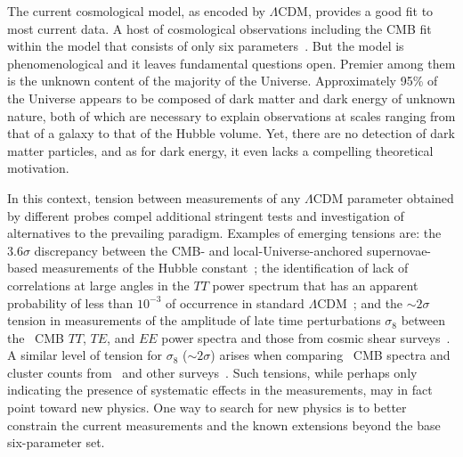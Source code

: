 \documentclass[PICOReport.tex]{subfiles}
\begin{document}

The current cosmological model, as encoded by $\Lambda$CDM, provides a good fit to most current data. A host of cosmological observations including the CMB fit within the model that consists of only six parameters~\citep{Planck2018_I}. But the model is phenomenological and it leaves fundamental questions open. Premier among them is the unknown content of the majority of the Universe. Approximately 95\% of the Universe appears to be composed of dark matter and dark energy of unknown nature, both of which are necessary to explain observations at scales ranging from that of a galaxy to that of the Hubble volume. Yet, there are no detection of dark matter particles, and as for dark energy, it even lacks a compelling theoretical motivation.

In this context, tension between measurements of any $\Lambda$CDM parameter obtained by different probes compel additional stringent tests and investigation of alternatives to the prevailing paradigm. Examples of emerging tensions are: the $3.6\sigma$ discrepancy between the CMB- and local-Universe-anchored supernovae-based measurements of the Hubble constant~\citep{Aghanim:2018eyx,Riess2018}; the identification of lack of correlations at large angles in the $TT$ power spectrum that has an apparent probability of less than $10^{-3}$ of occurrence in standard $\Lambda$CDM~\citep{TT_correlations}; and the $\sim 2\sigma$ tension in measurements of the amplitude of late time perturbations $\sigma_{8}$ between 
the \planck\ CMB $TT$, $TE$, and $EE$ power spectra and those from cosmic shear surveys~\citep{Joudaki+2017, Abbott+2018, Hikage+2018, vanUitert+2018}.  A similar level  of tension for $\sigma_{8}$ ($\sim2\sigma$) arises when comparing \planck\ CMB spectra and cluster counts from \planck\ and other surveys~\citep{Planck, Bocquet+2018}. Such tensions, while perhaps only indicating the presence of systematic effects in the measurements, may in fact point toward new physics. One way to search for new physics is to better constrain the current measurements and the known extensions beyond the base six-parameter set. 
\end{document}
